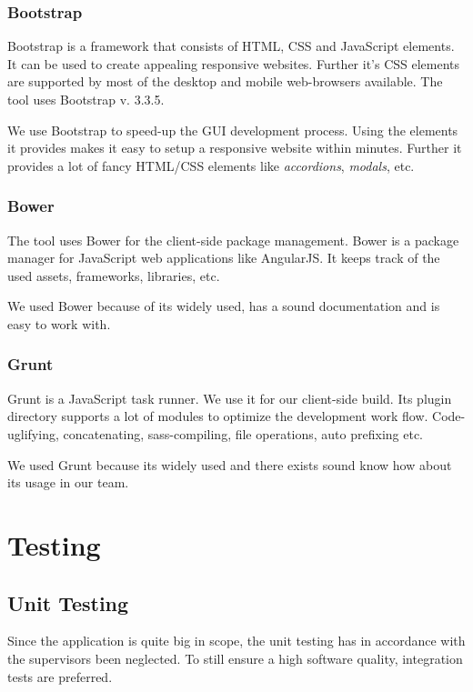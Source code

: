 \subsubsection{Bootstrap}
Bootstrap is a framework that consists of HTML, CSS and JavaScript elements. It can be used to create appealing responsive websites. Further it's CSS elements are supported by most of the desktop and mobile web-browsers available. The tool uses Bootstrap v. 3.3.5. \cite{bootstrap}\par
We use Bootstrap to speed-up the GUI development process. Using the elements it provides makes it easy to setup a responsive website within minutes. Further it provides a lot of fancy HTML/CSS elements like \textit{accordions}, \textit{modals}, etc.

\subsubsection{Bower}
The tool uses Bower for the client-side package management. Bower is a package manager for JavaScript web applications like AngularJS. It keeps track of the used assets, frameworks, libraries, etc. \cite{bower} \par
We used Bower because of its widely used, has a sound documentation and is easy to work with.

\subsubsection{Grunt}
Grunt is a JavaScript task runner. We use it for our client-side build. Its plugin directory supports a lot of modules to optimize the development work flow. Code-uglifying, concatenating, sass-compiling, file operations, auto prefixing etc. \cite{grunt} \par
We used Grunt because its widely used and there exists sound know how about its usage in our team.



\section{Testing}

\subsection{Unit Testing}
Since the application is quite big in scope, the unit testing has in accordance with the supervisors been neglected. To still ensure a high software quality, integration tests are preferred.

